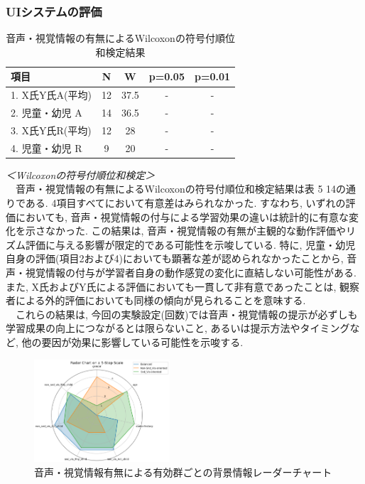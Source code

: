 \documentclass[paper]{ieicej}
\begin{document}
\subsubsection{UIシステムの評価}
\begin{table}[t]
  \centering
  \caption{音声・視覚情報の有無によるWilcoxonの符号付順位和検定結果}
  \begin{tabularx}{\linewidth}{X c c c c}
    \toprule
      項目 & N & W & p=0.05 & p=0.01 \\
    \midrule
      1. X氏Y氏A(平均) & 12 & 37.5 & - & - \\
      2. 児童・幼児 A & 14 & 36.5 & - & - \\
      3. X氏Y氏R(平均) & 12 & 28 & - & - \\
      4. 児童・幼児 R & 9 & 20 & - & - \\
    \bottomrule
  \end{tabularx}
\end{table}
\textit{＜Wilcoxonの符号付順位和検定＞}\\
　音声・視覚情報の有無によるWilcoxonの符号付順位和検定結果は表 5 14の通りである. 4項目すべてにおいて有意差はみられなかった. すなわち, いずれの評価においても, 音声・視覚情報の付与による学習効果の違いは統計的に有意な変化を示さなかった. この結果は, 音声・視覚情報の有無が主観的な動作評価やリズム評価に与える影響が限定的である可能性を示唆している. 特に, 児童・幼児自身の評価(項目2および4)においても顕著な差が認められなかったことから, 音声・視覚情報の付与が学習者自身の動作感覚の変化に直結しない可能性がある. また, X氏およびY氏による評価においても一貫して非有意であったことは, 観察者による外的評価においても同様の傾向が見られることを意味する. \\
　これらの結果は, 今回の実験設定(回数)では音声・視覚情報の提示が必ずしも学習成果の向上につながるとは限らないこと, あるいは提示方法やタイミングなど, 他の要因が効果に影響している可能性を示唆する. \\
\begin{figure}[t]
  \centering
  \includegraphics[width=0.45\textwidth]{./images/radar_chart.png}
  \caption{音声・視覚情報有無による有効群ごとの背景情報レーダーチャート}
  \label{fig:radar_chart}
\end{figure}
\end{document}
